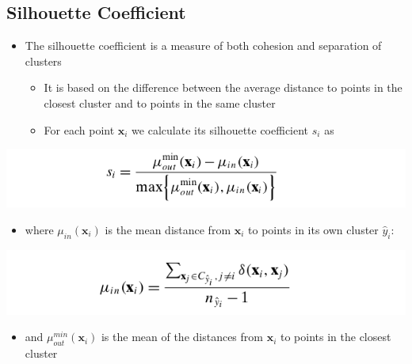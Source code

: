 \documentclass[11pt]{article}
\begin{document}
\subsection{Silhouette Coefficient}
\label{sec:org4a7e745}
\begin{itemize}
\item The silhouette coefficient is a measure of both cohesion and separation of clusters
\begin{itemize}
\item It is based on the difference between the average distance to points in the closest cluster and to points in the same cluster
\item For each point \(\pmb x_i\) we calculate its silhouette coefficient \(s_i\) as
\end{itemize}
\end{itemize}
\begin{center}
\includegraphics[width=.9\linewidth]{Clustering Validation/screenshot_2018-11-25_09-54-18.png}
\end{center}
\begin{itemize}
\item where \(\mu_{in} (\pmb x_i)\) is the mean distance from \(\pmb x_i\) to points in its own cluster \(\hat y_i\):
\end{itemize}
\begin{center}
\includegraphics[width=.9\linewidth]{Clustering Validation/screenshot_2018-11-25_09-55-13.png}
\end{center}
\begin{itemize}
\item and \(\mu_{out}^{min}(\pmb x_i)\) is the mean of the distances from \(\pmb x_i\) to points in the closest cluster
\end{itemize}
\end{document}
